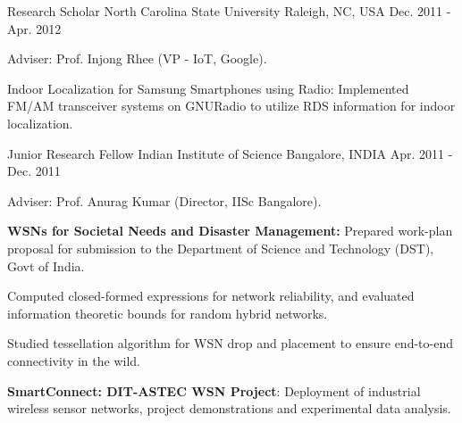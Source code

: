 \begin{cventries}
  \cventry
    {Research Scholar} %
    {North Carolina State University} %
    {Raleigh, NC, USA} %
    {Dec. 2011 - Apr. 2012} %
    {
      \begin{cvitems} %
      \item {Adviser: Prof. Injong Rhee (VP - IoT, Google).}
%      
      \item {Indoor Localization for Samsung Smartphones using Radio: Implemented FM/AM transceiver systems on GNURadio to utilize RDS information for indoor localization.}
%      
      \end{cvitems}
    }
    
  \cventry
    {Junior Research Fellow} %
    {Indian Institute of Science} %
    {Bangalore, INDIA} %
    {Apr. 2011 - Dec. 2011} %
    {
      \begin{cvitems} %
      \item {Adviser: Prof. Anurag Kumar (Director, IISc Bangalore).}
%      
      \item {\textbf{WSNs for Societal Needs and Disaster Management:} Prepared work-plan proposal for submission to the Department of Science and Technology (DST), Govt of India.}
      \item {Computed closed-formed expressions for network reliability, and evaluated information theoretic bounds for random hybrid networks.}
      \item {Studied tessellation algorithm for WSN drop and placement to ensure end-to-end connectivity in the wild.}
%      
      \item {\textbf{SmartConnect: DIT-ASTEC WSN Project}: Deployment of industrial wireless sensor networks, project demonstrations and experimental data analysis.}
      \end{cvitems}
    }
    

\end{cventries}
